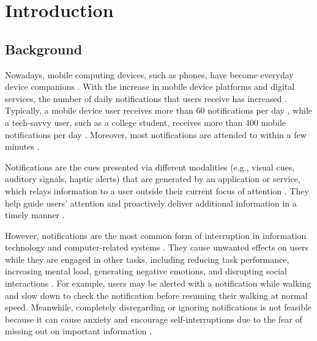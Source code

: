 
\chapter{Introduction}
\label{ch:Introduction}


\section{Background}
\label{sec:Intro:thesis_background}

Nowadays, mobile computing devices, such as phones, have become everyday device companions \cite{hakoama2011impact, dey_getting_2011}. With the increase in mobile device platforms and digital services, the number of daily notifications that users receive has increased \cite{chuang_ambient_2017, noauthor_push_2019, statista_us_2021}. Typically, a mobile device user receives more than 60 notifications per day \cite{sahami_shirazi_large_scale_2014, pielot_dismissed_2018}, while a tech-savvy user, such as a college student, receives more than 400 mobile notifications per day \cite{lee_hooked_2014}. Moreover, most notifications are attended to within a few minutes \cite{pielot_situ_2014, sahami_shirazi_large_scale_2014, pielot_dismissed_2018}.

Notifications are the cues presented via different modalities (e.g., visual cues, auditory signals, haptic alerts) that are generated by an application or service, which relays information to a user outside their current focus of attention \cite{iqbal_notifications_2010}. They help guide users' attention and proactively deliver additional information in a timely manner \cite{horvitz_balancing_2005, paul_interruptive_2015, iqbal_notifications_2010, pielot_situ_2014}.

However, notifications are the most common form of interruption in information technology and computer-related systems \cite{addas_many_2015}. They cause unwanted effects on users while they are engaged in other tasks, including reducing task performance, increasing mental load, generating negative emotions, and disrupting social interactions \cite{stothart_attentional_2015, bailey_effects_2001, cutrell_notification_2001, adamczyk_if_2004, kushlev_silence_2016, mcatamney_examination_2006, horvitz_busybody_2004, leiva_back_2012}. For example, users may be alerted with a notification while walking and slow down to check the notification before resuming their walking at normal speed. Meanwhile, completely disregarding or ignoring notifications is not feasible because it can cause anxiety and encourage self-interruptions due to the fear of missing out on important information \cite{pielot_productive_2017, iqbal_notifications_2010}.


